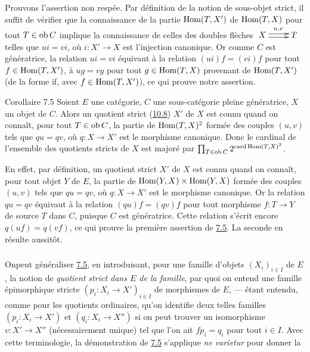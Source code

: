 \documentclass[10pt]{../fichiers-configuration-latex/smfart}
\begin{document}
Prouvons l'assertion non respée. Par définition de la notion de
sous-objet strict, il suffit de vérifier que la connaissance de la
partie $\operatorname{Hom}(T,X')$ de $\operatorname{Hom}(T,X)$ pour tout $T\in\operatorname{ob} C$ implique la
connaissance de celles des doubles flèches $\xymatrix{
X\ar@<2pt>[r]^{u,v}\ar@<-2pt>[r]& T }$ telles que $ui=vi$, où
$i:X'\rightarrow X$ est l'injection canonique. Or comme $C$ est
génératrice, la relation $ui=vi$ équivaut à la relation
$(ui)f=(vi)f$ pour tout $f\in \operatorname{Hom}(T,X')$, \ie à $ug=vg$ pour tout
$g\in \operatorname{Hom}(T,X)$ provenant de $\operatorname{Hom}(T,X')$ (\ie de la forme if, avec
$f\in \operatorname{Hom}(T,X')$), ce qui prouve notre assertion.

\begin{enonce*}{Corollaire 7.5}
Soient $E$ une catégorie, $C$ une sous-catégorie pleine
génératrice,
$X$ un objet de $C$. Alors un quotient strict (\hyperref[I.sec10.8]{10.8}) $X'$ de $X$
est connu quand on connaît, pour tout $T\in \operatorname{ob} C$, la partie de
$\operatorname{Hom}(T,X)^2$ formée des couples $(u,v)$ tels que $qu=qv$, où
$q:X\rightarrow X'$ est le morphisme canonique. Donc le cardinal de
l'ensemble des quotients stricts de $X$ est majoré par $\prod_{T\in
\operatorname{ob} C} 2^{\operatorname{card}\operatorname{Hom}(T,X)^2}$.
\end{enonce*}

En effet, par %
définition, un quotient strict $X'$ de $X$ est connu quand on
connaît, pour tout objet $Y$ de $E$, la partie de $\operatorname{Hom}(Y,X)\times
\operatorname{Hom}(Y,X)$ formée des couples $(u,v)$ tels que $qu=qv$, où
$q:X\rightarrow X'$ est le morphisme canonique. Or la relation
$qu=qv$ équivaut à la relation $(qu)f=(qv)f$ pour tout morphisme
$f:T\rightarrow Y$ de source $T$ dans $C$, puisque $C$ est
génératrice. Cette relation s'écrit encore $q(uf)=q(vf)$, ce qui
prouve la première assertion de \hyperref[I.cor7.5]{7.5}. La seconde en
résulte aussitôt.

\setcounter{subsection}{5} \setcounter{subsubsection}{0}
\subsubsection{}
On\pageoriginale peut généraliser \hyperref[I.cor7.5]{7.5}, en
introduisant, pour une
famille d'objets $(X_i)_{i\in I}$ de $E$, la notion de
\emph{quotient
  strict dans $E$ de la famille}, par quoi on entend une famille
épimorphique stricte $(p_i:X_i\rightarrow X')_{i\in I}$ de
morphismes de $E$, --- étant entendu, comme pour les quotients
ordinaires, qu'on identifie deux telles familles
$(p_i:X_i\rightarrow X')$ et $(q_i:X_i\rightarrow X'')$ si on peut
trouver un isomorphisme $v:X'\rightarrow X''$ (nécessairement
unique) tel que l'on ait $fp_i=q_i$ pour tout $i\in I$. Avec cette
terminologie, la démonstration de \hyperref[I.cor7.5]{7.5} s'applique {\it ne
varietur} pour donner la
\end{document}
